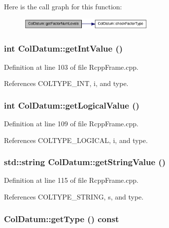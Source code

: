 Here is the call graph for this function:\nopagebreak
\begin{figure}[H]
\begin{center}
\leavevmode
\includegraphics[width=189pt]{classColDatum_a9b5db8254be428e68c61805f02723821_cgraph}
\end{center}
\end{figure}
\hypertarget{classColDatum_af498266608526c9db7f865bc66cc5e40}{
\subsubsection[{getIntValue}]{\setlength{\rightskip}{0pt plus 5cm}int ColDatum::getIntValue ()}}
\label{classColDatum_af498266608526c9db7f865bc66cc5e40}


Definition at line 103 of file RcppFrame.cpp.

References COLTYPE\_\-INT, i, and type.\hypertarget{classColDatum_adf81b2aed6f8e19b6f36310288991f38}{
\subsubsection[{getLogicalValue}]{\setlength{\rightskip}{0pt plus 5cm}int ColDatum::getLogicalValue ()}}
\label{classColDatum_adf81b2aed6f8e19b6f36310288991f38}


Definition at line 109 of file RcppFrame.cpp.

References COLTYPE\_\-LOGICAL, i, and type.\hypertarget{classColDatum_ad0d76d861441151f31cf42acff4b8c0f}{
\subsubsection[{getStringValue}]{\setlength{\rightskip}{0pt plus 5cm}std::string ColDatum::getStringValue ()}}
\label{classColDatum_ad0d76d861441151f31cf42acff4b8c0f}


Definition at line 115 of file RcppFrame.cpp.

References COLTYPE\_\-STRING, s, and type.\hypertarget{classColDatum_aae862d41617b3ae39f88b5b729ccccc3}{
\subsubsection[{getType}]{ ColDatum::getType () const}}
\label{classColDatum_aae862d41617b3ae39f88b5b729ccccc3}


